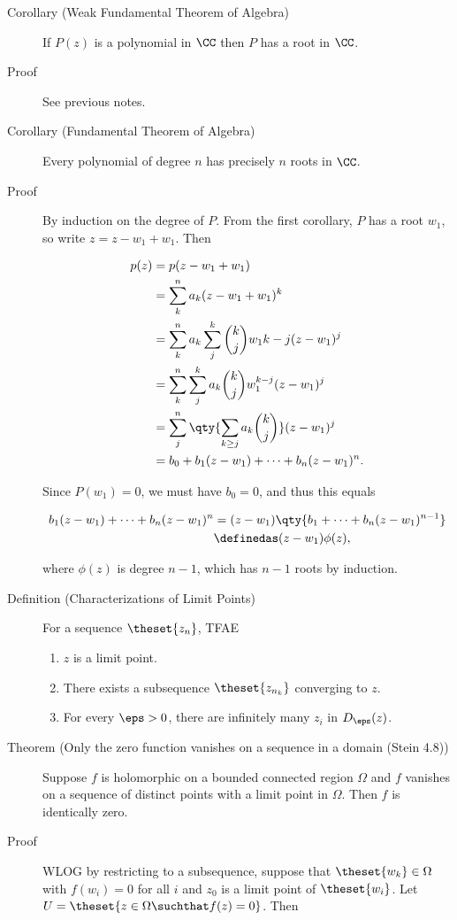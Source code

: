 \begin{description}
\item[Corollary (Weak Fundamental Theorem of Algebra)]
If \(P(z)\) is a polynomial in \(\CC\) then \(P\) has a root in \(\CC\).
\item[Proof]
See previous notes.
\item[Corollary (Fundamental Theorem of Algebra)]
Every polynomial of degree \(n\) has precisely \(n\) roots in \(\CC\).
\item[Proof]
By induction on the degree of \(P\). From the first corollary, \(P\) has
a root \(w_1\), so write \(z = z-w_1 + w_1\). Then

\begin{align*}
p(z) 
&= p(z - w_1 + w_1) \\
&= \sum_k^n a_k(z -w_1 + w_1)^k \\
&= \sum_k^n a_k \sum_{j}^k {k\choose j} w_1{k-j} (z-w_1)^j \\
&= \sum_k^n \sum_j^k a_k {k\choose j} w_1^{k-j} (z-w_1)^j \\
&= \sum_j^n \qty{\sum_{k\geq j} a_k {k\choose j}}(z-w_1)^j \\
&= b_0 + b_1(z-w_1) + \cdots + b_n(z-w_1)^n 
.\end{align*}

Since \(P(w_1) = 0\), we must have \(b_0 = 0\), and thus this equals

\begin{align*}
b_1(z-w_1) + \cdots + b_n(z-w_1)^n 
&= (z-w_1) \qty{ b_1 + \cdots + b_n (z-w_1)^{n-1}  } \\
&\definedas  (z-w_1) \phi(z)
,\end{align*}

where \(\phi(z)\) is degree \(n-1\), which has \(n-1\) roots by
induction.
\item[Definition (Characterizations of Limit Points)]
For a sequence \(\theset{z_n}\), TFAE

\begin{enumerate}
\def\labelenumi{\arabic{enumi}.}
\tightlist
\item
  \(z\) is a limit point.
\item
  There exists a subsequence \(\theset{z_{n_k}}\) converging to \(z\).
\item
  For every \(\eps > 0\), there are infinitely many \(z_i\) in
  \(D_\eps(z)\).
\end{enumerate}
\item[Theorem (Only the zero function vanishes on a sequence in a domain
(Stein 4.8))]
Suppose \(f\) is holomorphic on a bounded connected region \(\Omega\)
and \(f\) vanishes on a sequence of distinct points with a limit point
in \(\Omega\). Then \(f\) is identically zero.
\item[Proof]
WLOG by restricting to a subsequence, suppose that
\(\theset{w_k} \in \Omega\) with \(f(w_i) = 0\) for all \(i\) and
\(z_0\) is a limit point of \(\theset{w_i}\). Let
\(U = \theset{ z\in \Omega \suchthat f(z) = 0 }\). Then


\end{description}
